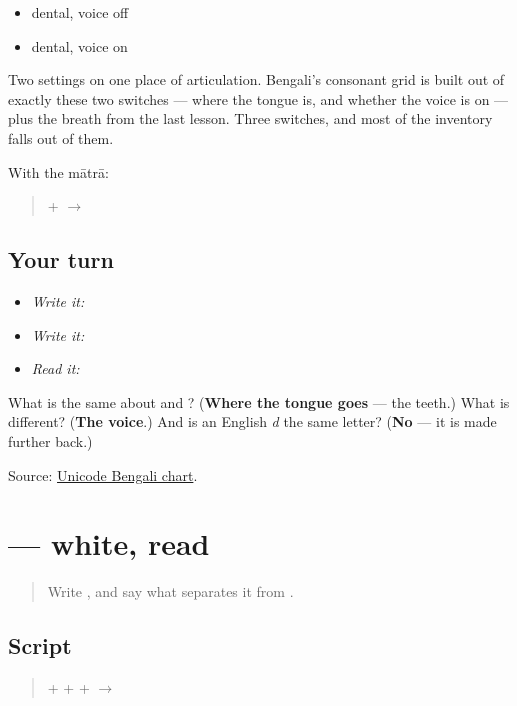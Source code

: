 \begin{itemize}
\raggedright
  \item \textbf{} dental, voice off
  \item \textbf{} dental, voice on
\end{itemize}

Two settings on one place of articulation. Bengali's consonant grid is built out of exactly these two switches — where the tongue is, and whether the voice is on — plus the breath from the last lesson. Three switches, and most of the inventory falls out of them.

With the mātrā:

\begin{quote}
\textbf{} + \textbf{} $\to$ \textbf{}
\end{quote}

\subsection*{Your turn}
\begin{itemize}
\raggedright
  \item \emph{Write it:} 
  \item \emph{Write it:}  
  \item \emph{Read it:} 
\end{itemize}

\begin{tcolorbox}[breakable,colback=teal!4,colframe=teal!35!black,title={Before you move on}]
What is the same about \textbf{} and \textbf{}? (\textbf{Where the tongue goes} — the teeth.) What is different? (\textbf{The voice}.) And is an English \emph{d} the same letter? (\textbf{No} — it is made further back.)

Source: \href{https://www.unicode.org/charts/PDF/U0980.pdf}{Unicode Bengali chart}.
\end{tcolorbox}
\section[shādā]{ — white, read}

\label{lesson:BN-W03-shada-read}



\begin{quote}
Write \textbf{}, and say what separates it from \textbf{}.
\end{quote}

\subsection*{Script}
\begin{quote}
\textbf{} + \textbf{} + \textbf{} + \textbf{} $\to$ \textbf{}
\end{quote}

